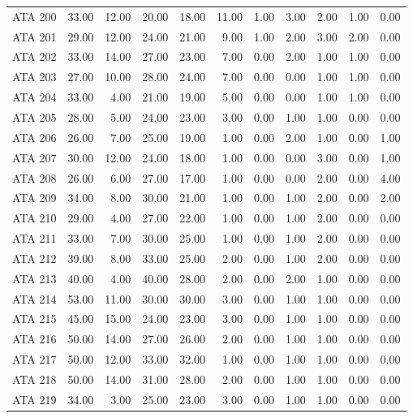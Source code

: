 \begin{landscape}
\begin{longtable}{rrrrrrrrrrr}
  ATA 200 & 33.00 & 12.00 & 20.00 & 18.00 & 11.00 & 1.00 & 3.00 & 2.00 & 1.00 & 0.00 \\ 
  ATA 201 & 29.00 & 12.00 & 24.00 & 21.00 & 9.00 & 1.00 & 2.00 & 3.00 & 2.00 & 0.00 \\ 
  ATA 202 & 33.00 & 14.00 & 27.00 & 23.00 & 7.00 & 0.00 & 2.00 & 1.00 & 1.00 & 0.00 \\ 
  ATA 203 & 27.00 & 10.00 & 28.00 & 24.00 & 7.00 & 0.00 & 0.00 & 1.00 & 1.00 & 0.00 \\ 
  ATA 204 & 33.00 & 4.00 & 21.00 & 19.00 & 5.00 & 0.00 & 0.00 & 1.00 & 1.00 & 0.00 \\ 
  ATA 205 & 28.00 & 5.00 & 24.00 & 23.00 & 3.00 & 0.00 & 1.00 & 1.00 & 0.00 & 0.00 \\ 
  ATA 206 & 26.00 & 7.00 & 25.00 & 19.00 & 1.00 & 0.00 & 2.00 & 1.00 & 0.00 & 1.00 \\ 
  ATA 207 & 30.00 & 12.00 & 24.00 & 18.00 & 1.00 & 0.00 & 0.00 & 3.00 & 0.00 & 1.00 \\ 
  ATA 208 & 26.00 & 6.00 & 27.00 & 17.00 & 1.00 & 0.00 & 0.00 & 2.00 & 0.00 & 4.00 \\ 
  ATA 209 & 34.00 & 8.00 & 30.00 & 21.00 & 1.00 & 0.00 & 1.00 & 2.00 & 0.00 & 2.00 \\ 
  ATA 210 & 29.00 & 4.00 & 27.00 & 22.00 & 1.00 & 0.00 & 1.00 & 2.00 & 0.00 & 0.00 \\ 
  ATA 211 & 33.00 & 7.00 & 30.00 & 25.00 & 1.00 & 0.00 & 1.00 & 2.00 & 0.00 & 0.00 \\ 
  ATA 212 & 39.00 & 8.00 & 33.00 & 25.00 & 2.00 & 0.00 & 1.00 & 2.00 & 0.00 & 0.00 \\ 
  ATA 213 & 40.00 & 4.00 & 40.00 & 28.00 & 2.00 & 0.00 & 2.00 & 1.00 & 0.00 & 0.00 \\ 
  ATA 214 & 53.00 & 11.00 & 30.00 & 30.00 & 3.00 & 0.00 & 1.00 & 1.00 & 0.00 & 0.00 \\ 
  ATA 215 & 45.00 & 15.00 & 24.00 & 23.00 & 3.00 & 0.00 & 1.00 & 1.00 & 0.00 & 0.00 \\ 
  ATA 216 & 50.00 & 14.00 & 27.00 & 26.00 & 2.00 & 0.00 & 1.00 & 1.00 & 0.00 & 0.00 \\ 
  ATA 217 & 50.00 & 12.00 & 33.00 & 32.00 & 1.00 & 0.00 & 1.00 & 1.00 & 0.00 & 0.00 \\ 
  ATA 218 & 50.00 & 14.00 & 31.00 & 28.00 & 2.00 & 0.00 & 1.00 & 1.00 & 0.00 & 0.00 \\ 
  ATA 219 & 34.00 & 3.00 & 25.00 & 23.00 & 3.00 & 0.00 & 1.00 & 1.00 & 0.00 & 0.00 \\ 
   \hline
\end{longtable}
\end{landscape}

